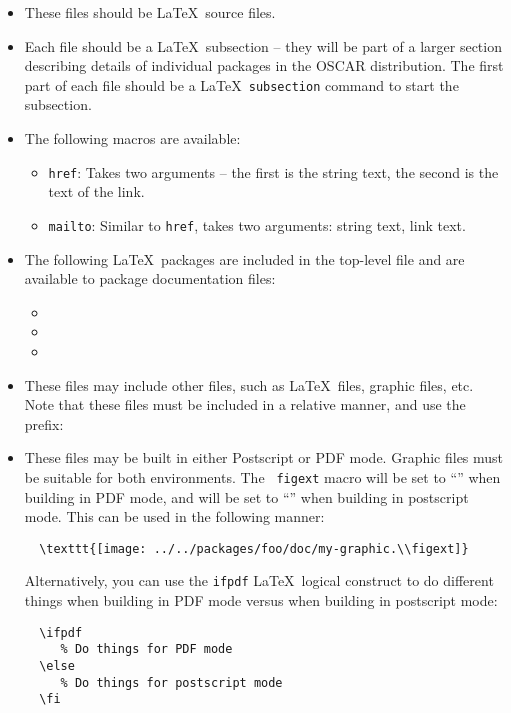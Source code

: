 \begin{itemize}
\item These files should be \LaTeX\ source files.

\item Each file should be a \LaTeX\ subsection -- they will be part of
  a larger section describing details of individual packages in the
  OSCAR distribution.  The first part of each file should be a \LaTeX\
  {\tt subsection} command to start the subsection.

\item The following macros are available:

  \begin{itemize}
  \item {\tt href}: Takes two arguments -- the first is the string
    text, the second is the text of the link.

  \item {\tt mailto}: Similar to {\tt href}, takes two arguments:
    string text, link text.
  \end{itemize}

\item The following \LaTeX\ packages are included in the top-level
  file and are available to package documentation files:

  \begin{itemize}
  \item {}
  \item {}
  \item {}
  \end{itemize}

\item These files may include other files, such as \LaTeX\ files,
  graphic files, etc.  Note that these files must be included in a
  relative manner, and use the prefix: 

  \vspace{10pt}
  \centerline{}
  
\item These files may be built in either Postscript or PDF mode.
  Graphic files must be suitable for both environments.  The {\tt
    figext} macro will be set to ``\file{png}'' when building in PDF
  mode, and will be set to ``\file{eps}'' when building in postscript
  mode.  This can be used in the following manner:

\begin{verbatim}
  \texttt{[image: ../../packages/foo/doc/my-graphic.\\figext]}
\end{verbatim}
  
  Alternatively, you can use the {\tt ifpdf} \LaTeX\ logical construct
  to do different things when building in PDF mode versus when
  building in postscript mode:

\begin{verbatim}
  \ifpdf
     % Do things for PDF mode
  \else
     % Do things for postscript mode
  \fi
\end{verbatim}

\end{itemize}

